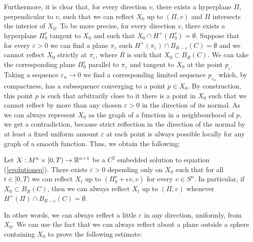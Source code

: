  Furthermore, it is clear that, for every direction $v$, there exists a hyperplane $\Pi$, perpendicular to $v$, such that we can reflect $X_0$ up to $(\Pi, v)$ and $\Pi$ intersects the interior of $X_0$. To be more precise, for every direction $v$, there exists a hyperplane $\Pi_0^v$ tangent to $X_0$ and such that $X_0\cap H^+(\Pi_0^v)=\emptyset$. Suppose that for every $\varepsilon>0$ we can find a plane $\pi_\varepsilon$ such $H^+(\pi_\varepsilon)\cap B_{R-\varepsilon}(C)=\emptyset$ and we cannot reflect $X_0$ strictly at $\pi_\varepsilon$, where $R$ is such that $X_0 \subset B_R (C)$. We can take the corresponding plane $\Pi_0^\varepsilon$ parallel to $\pi_\varepsilon$ and tangent to $X_0$ at the point $p_\varepsilon$. Taking a sequence $\varepsilon_n \rightarrow 0$ we find a corresponding limited sequence $p_{\varepsilon_n}$ which, by compactness, has a subsequence converging to a point $p\in X_0$. By construction, this point $p$ is such that arbitrarily close to it there is a point in $X_0$ such that we cannot reflect by more than any chosen $\varepsilon>0$ in the direction of its normal. As we can always represent $X_0$ as the graph of a function in a neighbourhood of $p$, we get a contradiction, because strict reflection in the direction of the normal by at least a fixed uniform amount $\varepsilon$ at each point is always possible locally for any graph of a smooth function. Thus, we obtain the following:
 
\begin{cor}
	Let $X:M^n\times [0,T) \rightarrow \mathbb{R}^{n+1}$ be a $C^2$ embedded solution to equation (\ref{evolutioneq}). There exists $\varepsilon>0$ depending only on $X_0$ such that for all $t\in[0, T)$ we can reflect $X_t$ up to $(\Pi_0^v +\epsilon v, v)$ for every $v \in S^n$. In particular, if $X_0 \subset B_R (C)$, then we can always reflect $X_t$ up to $(\Pi, v)$ whenever $H^+(\Pi)\cap B_{R-\varepsilon}(C)=\emptyset$.\label{reflect a small bit}
\end{cor}
In other words, we can always reflect a little $\varepsilon$ in any direction, uniformly, from $X_0$. We can use the fact that we can always reflect about a plane outside a sphere containing $X_0$ to prove the following estimate:




